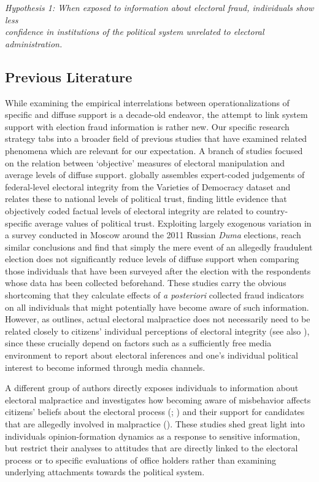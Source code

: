 \documentclass[11pt, ngerman,english,a4]{article}
\begin{document}
\indent \textit{Hypothesis 1: When exposed to information about electoral fraud, individuals show less \\ \indent confidence in institutions of the political system unrelated to electoral administration.} \\


\subsection*{Previous Literature}
While examining the empirical interrelations between operationalizations of specific and diffuse support is a decade-old endeavor, the attempt to link system support with election fraud information is rather new. Our specific research strategy tabs into a broader field of previous studies that have examined related phenomena which are relevant for our expectation. A branch of studies focused on the relation between `objective' measures of electoral manipulation and average levels of diffuse support. \citet{Mauk2019} globally assembles expert-coded judgements of federal-level electoral integrity from the Varieties of Democracy dataset and relates these to national levels of political trust, finding little evidence that objectively coded factual levels of electoral integrity are related to country-specific average values of political trust. Exploiting largely exogenous variation in a survey conducted in Moscow around the 2011 Russian \textit{Duma} elections, \citet{Frye2019} reach similar conclusions and find that simply the mere event of an allegedly fraudulent election does not significantly reduce levels of diffuse support when comparing those individuals that have been surveyed after the election with the respondents whose data has been collected beforehand. These studies carry the obvious shortcoming that they calculate effects of \textit{a posteriori} collected fraud indicators on all individuals that might potentially have become aware of such information. However, as \citet{Mauk2019} outlines, actual electoral malpractice does not necessarily need to be related closely to citizens' individual perceptions of electoral integrity (see also \citealt{VanHam2015}), since these crucially depend on factors such as a sufficiently free media environment to report about electoral inferences and one's individual political interest to become informed through media channels. 

A different group of authors directly exposes individuals to information about electoral malpractice and investigates how becoming aware of misbehavior affects citizens' beliefs about the electoral process (\citealt{Robertson2017};  \citealt{Bush2018}) and their support for candidates that are allegedly involved in malpractice (\citealt{Reuter2019}). These studies shed great light into individuals opinion-formation dynamics as a response to sensitive information, but restrict their analyses to attitudes that are directly linked to the electoral process or to specific evaluations of office holders rather than examining underlying attachments towards the political system.    
\end{document}

